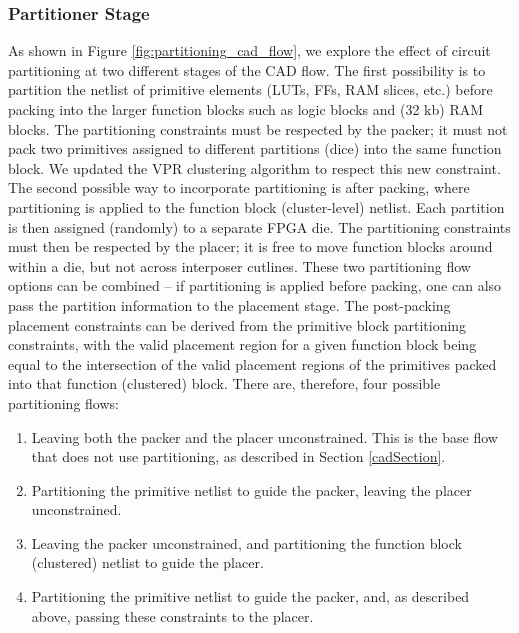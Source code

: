\subsubsection{Partitioner Stage}\label{sec:partitioner_stage}
As shown in Figure \ref{fig:partitioning_cad_flow}, we explore the effect of circuit partitioning at two different stages of the CAD flow. The first possibility is to partition the netlist of primitive elements (LUTs, FFs, RAM slices, etc.) before packing into the larger function blocks such as logic blocks and (32 kb) RAM blocks. The partitioning constraints must be respected by the packer; it must not pack two primitives assigned to different partitions (dice) into the same function block. We updated the VPR clustering algorithm to respect this new constraint. The second possible way to incorporate partitioning is after packing, where partitioning is applied to the function block (cluster-level) netlist. Each partition is then assigned (randomly) to a separate FPGA die. The partitioning constraints must then be respected by the placer; it is free to move function blocks around within a die, but not across interposer cutlines. These two partitioning flow options can be combined -- if partitioning is applied before packing, one can also pass the partition information to the placement stage. The post-packing placement constraints can be derived from the primitive block partitioning constraints, with the valid placement region for a given function block being equal to the intersection of the valid placement regions of the primitives packed into that function (clustered) block. There are, therefore, four possible partitioning flows:

\begin{enumerate}
  \item Leaving both the packer and the placer unconstrained. This is the base flow that does not use partitioning, as described in Section \ref{cadSection}.
  \item Partitioning the primitive netlist to guide the packer, leaving the placer unconstrained.
  \item Leaving the packer unconstrained, and partitioning the function block (clustered) netlist to guide the placer.
  \item Partitioning the primitive netlist to guide the packer, and, as described above, passing these constraints to the placer.
\end{enumerate}


